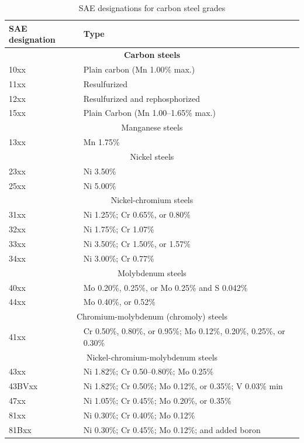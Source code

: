 \documentclass[
10pt,
a4paper,
openany,
svgnames,
]{book}
\begin{document}
\begin{table}[H] 
  \centering
  \caption{SAE designations for carbon steel grades \cite{oberg2016machinery}}
  \begin{tabular}{ll}
    \toprule
    SAE designation & Type \\
    \midrule
    \multicolumn{2}{c}{\textbf{Carbon steels}}  \\
    10xx & Plain carbon (Mn 1.00\% max.) \\
    11xx & Resulfurized \\
    12xx & Resulfurized and rephosphorized \\
    15xx & Plain Carbon (Mn 1.00–1.65\% max.) \\
    \multicolumn{2}{c}{Manganese steels}  \\
    13xx & Mn 1.75\% \\
    \multicolumn{2}{c}{Nickel steels} \\
    23xx & Ni 3.50\% \\
    25xx & Ni 5.00\% \\
    \multicolumn{2}{c}{Nickel-chromium steels} \\
    31xx & Ni 1.25\%; Cr 0.65\%, or 0.80\% \\
    32xx & Ni 1.75\%; Cr 1.07\% \\
    33xx & Ni 3.50\%; Cr 1.50\%, or 1.57\% \\
    34xx & Ni 3.00\%; Cr 0.77\% \\
    \multicolumn{2}{c}{Molybdenum steels} \\
    40xx & Mo 0.20\%, 0.25\%, or Mo 0.25\% and S 0.042\% \cite{bringas2004handbook} \\
    44xx & Mo 0.40\%, or 0.52\% \\
    \multicolumn{2}{c}{Chromium-molybdenum (chromoly) steels} \\
    41xx & Cr 0.50\%, 0.80\%, or 0.95\%; Mo 0.12\%, 0.20\%, 0.25\%, or 0.30\% \\
    \multicolumn{2}{c}{Nickel-chromium-molybdenum steels} \\
    43xx & Ni 1.82\%; Cr 0.50–0.80\%; Mo 0.25\% \\
    43BVxx & Ni 1.82\%; Cr 0.50\%; Mo 0.12\%, or 0.35\%; V 0.03\% min \\
    47xx & Ni 1.05\%; Cr 0.45\%; Mo 0.20\%, or 0.35\% \\
    81xx & Ni 0.30\%; Cr 0.40\%; Mo 0.12\% \\
    81Bxx & Ni 0.30\%; Cr 0.45\%; Mo 0.12\%; and added boron \cite{bringas2004handbook} \\

\end{tabular}
\end{table}
\end{document}
